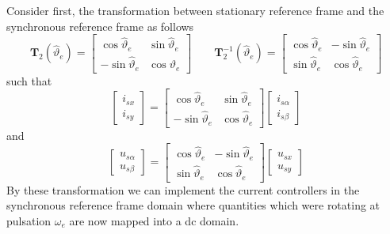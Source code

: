 \documentclass[12pt,a4paper,oneside]{book}
\begin{document}
\begin{onehalfspace}
Consider first, the transformation between stationary reference frame and the 
synchronous reference frame as follows
\begin{equation}\label{im_control_problem_eq_17}
	\mathbf{T}_2(\hat{\vartheta}_e)=\begin{bmatrix}
		\cos\hat{\vartheta}_e & \sin\hat{\vartheta}_e \\[6pt]
		-\sin\hat{\vartheta}_e & \cos\vartheta_e 
	\end{bmatrix} \qquad
	\mathbf{T}_2^{-1}(\hat{\vartheta}_e)=\begin{bmatrix}
		\cos\hat{\vartheta}_e & -\sin\hat{\vartheta}_e \\[6pt]
		\sin\hat{\vartheta}_e & \cos\hat{\vartheta}_e 
	\end{bmatrix}
\end{equation}
such that
\begin{equation}\label{im_control_problem_eq_18}
	\begin{bmatrix}
		i_{sx} \\[6pt]
		i_{sy}
	\end{bmatrix} = 
	\begin{bmatrix}
		\cos\hat{\vartheta}_e & \sin\hat{\vartheta}_e \\[6pt]
		-\sin\hat{\vartheta}_e & \cos\hat{\vartheta}_e 
	\end{bmatrix}
	\begin{bmatrix}
		i_{s\alpha} \\[6pt]
		i_{s\beta}
	\end{bmatrix}
\end{equation}
and
\begin{equation}\label{im_control_problem_eq_19}
	\begin{bmatrix}
		u_{s\alpha} \\[6pt]
		u_{s\beta}
	\end{bmatrix} = 
	\begin{bmatrix}
		\cos\hat{\vartheta}_e & -\sin\hat{\vartheta}_e \\[6pt]
		\sin\hat{\vartheta}_e & \cos\hat{\vartheta}_e 
	\end{bmatrix}
	\begin{bmatrix}
		u_{sx} \\[6pt]
		u_{sy}
	\end{bmatrix}
\end{equation}
By these transformation we can implement the current controllers in the synchronous 
reference frame domain where quantities which were rotating at pulsation 
$\omega_e$ are now mapped into a dc domain. 


\end{onehalfspace}
\end{document}
